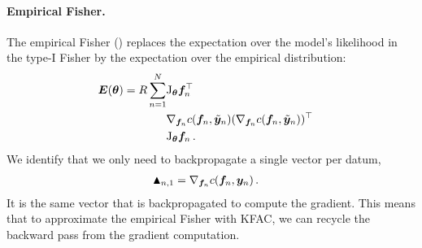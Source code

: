 \paragraph{Empirical Fisher.}
The empirical Fisher () replaces the expectation over the model's likelihood in the type-I Fisher by the expectation over the empirical distribution:
\begin{align*}
  &\begin{aligned}{\bm{E}}({\bm{\theta}}) = R \sum_{n=1}^N
    &\mathrm{J}_{{\bm{\theta}}} {\bm{f}}_n^{\top} \\
                               & \nabla_{{\bm{f}}_n} c({\bm{f}}_n, \tilde{{\bm{y}}}_{n}) (\nabla_{{\bm{f}}_n} c({\bm{f}}_n, \tilde{{\bm{y}}}_n ))^{\top} \\
                               &\mathrm{J}_{{\bm{\theta}}} {\bm{f}}_n\,.
  \end{aligned}
\end{align*}
We identify that we only need to backpropagate a single vector per datum,
\begin{align*}
  \blacktriangle_{n,1}
  &= \nabla_{{\bm{f}}_n}  c({\bm{f}}_n, {\bm{y}}_n)\,.
\end{align*}
It is the same vector that is backpropagated to compute the gradient.
This means that to approximate the empirical Fisher with KFAC, we can recycle the backward pass from the gradient computation.
